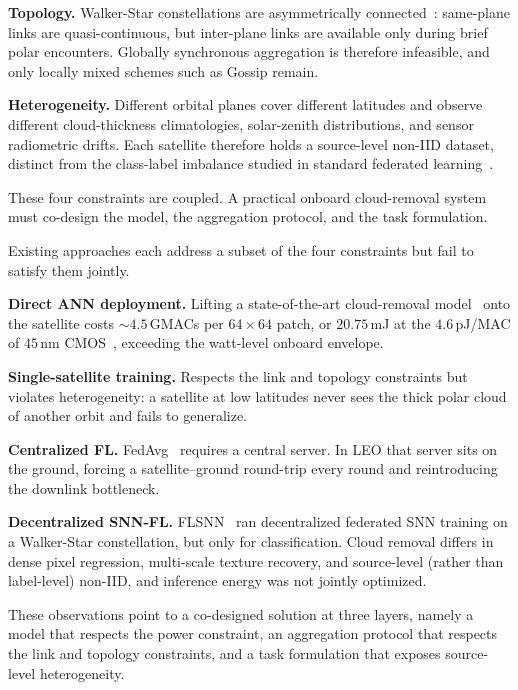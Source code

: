 \documentclass[conference]{IEEEtran}
\begin{document}
\textbf{Topology.} Walker-Star constellations are asymmetrically
connected~\cite{ref:walker1984}: same-plane links are
quasi-continuous, but inter-plane links are available only during
brief polar encounters. Globally synchronous aggregation is therefore
infeasible, and only locally mixed schemes such as Gossip remain.

\textbf{Heterogeneity.} Different orbital planes cover different
latitudes and observe different cloud-thickness climatologies,
solar-zenith distributions, and sensor radiometric drifts. Each
satellite therefore holds a source-level non-IID dataset, distinct
from the class-label imbalance studied in standard federated
learning~\cite{ref:hsu2019}.

These four constraints are coupled. A practical onboard
cloud-removal system must co-design the model, the aggregation
protocol, and the task formulation.

Existing approaches each address a subset of the four constraints
but fail to satisfy them jointly.

\textbf{Direct ANN deployment.} Lifting a state-of-the-art
cloud-removal model~\cite{ref:cuhkcr} onto the satellite costs
$\sim\!4.5$\,GMACs per $64\!\times\!64$ patch, or $20.75$\,mJ at the
$4.6$\,pJ/MAC of $45$\,nm CMOS~\cite{ref:horowitz2014}, exceeding
the watt-level onboard envelope.

\textbf{Single-satellite training.} Respects the link and topology
constraints but violates heterogeneity: a satellite at low latitudes
never sees the thick polar cloud of another orbit and fails to
generalize.

\textbf{Centralized FL.} FedAvg~\cite{ref:fedavg} requires a central
server. In LEO that server sits on the ground, forcing a
satellite--ground round-trip every round and reintroducing the
downlink bottleneck.

\textbf{Decentralized SNN-FL.} FLSNN~\cite{ref:flsnn} ran
decentralized federated SNN training on a Walker-Star constellation,
but only for classification. Cloud removal differs in dense pixel
regression, multi-scale texture recovery, and source-level
(rather than label-level) non-IID, and inference energy was not
jointly optimized.

These observations point to a co-designed solution at three layers,
namely a model that respects the power constraint, an aggregation
protocol that respects the link and topology constraints, and a task
formulation that exposes source-level heterogeneity.
\end{document}
